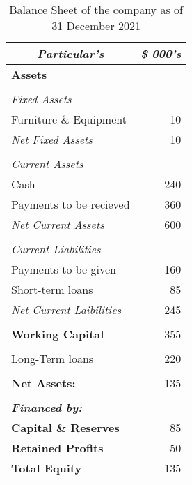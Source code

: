 \begin{table}[htbp]
  \centering
  \caption{Balance Sheet of the company as of 31 December 2021}
    \begin{tabular}{|l|r|}
    \hline
    \hline
    \toprule
    \multicolumn{1}{|c|}{\textit{\textbf{Particular's}}} & \multicolumn{1}{c|}{\textit{\textbf{\$ 000's}}} \\
    \hline
    \hline
    \midrule
    \textbf{Assets} &  \\
    \midrule
          &  \\
    \midrule
    \textit{Fixed Assets} &  \\
    \midrule
    Furniture \& Equipment & 10 \\
    \midrule
    \textit{Net Fixed Assets} & 10 \\
    \midrule
          &  \\
    \midrule
    \textit{Current Assets} &  \\
    \midrule
    Cash  & 240 \\
    \midrule
    Payments to be recieved  & 360 \\
    \midrule
    \textit{Net Current Assets} & 600 \\
    \midrule
          &  \\
    \midrule
    \textit{Current Liabilities} &  \\
    \midrule
    Payments to be given & 160 \\
    \midrule
    Short-term loans & 85 \\
    \midrule
    \textit{Net Current Laibilities} & 245 \\
    \midrule
          &  \\
    \midrule
    \textbf{Working Capital} & 355 \\
    \midrule
          &  \\
    \midrule
    Long-Term loans & 220 \\
    \midrule
          &  \\
    \midrule
    \textbf{Net Assets:} & 135 \\
    \midrule
          &  \\
    \midrule
    \textit{\textbf{Financed by:}} &  \\
    \midrule
    \textbf{Capital \& Reserves} & 85 \\
    \midrule
    \textbf{Retained Profits} & 50 \\
    \midrule
    \textbf{Total Equity} & 135 \\
    \bottomrule
    \hline
    \hline
    \end{tabular}%
  \label{tab:addlabel}%
\end{table}%


